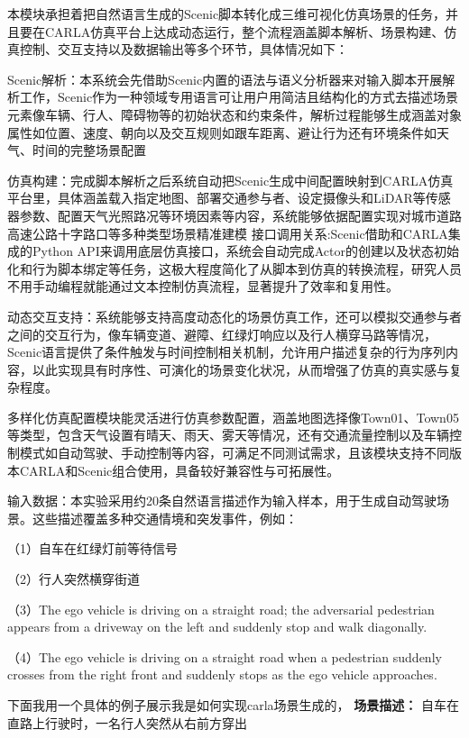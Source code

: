 本模块承担着把自然语言生成的Scenic脚本转化成三维可视化仿真场景的任务，并且要在CARLA仿真平台上达成动态运行，整个流程涵盖脚本解析、场景构建、仿真控制、交互支持以及数据输出等多个环节，具体情况如下：

Scenic解析：本系统会先借助Scenic内置的语法与语义分析器来对输入脚本开展解析工作，Scenic作为一种领域专用语言可让用户用简洁且结构化的方式去描述场景元素像车辆、行人、障碍物等的初始状态和约束条件，解析过程能够生成涵盖对象属性如位置、速度、朝向以及交互规则如跟车距离、避让行为还有环境条件如天气、时间的完整场景配置

仿真构建：完成脚本解析之后系统自动把Scenic生成中间配置映射到CARLA仿真平台里，具体涵盖载入指定地图、部署交通参与者、设定摄像头和LiDAR等传感器参数、配置天气光照路况等环境因素等内容，系统能够依据配置实现对城市道路高速公路十字路口等多种类型场景精准建模
接口调用关系:Scenic借助和CARLA集成的Python API来调用底层仿真接口，系统会自动完成Actor的创建以及状态初始化和行为脚本绑定等任务，这极大程度简化了从脚本到仿真的转换流程，研究人员不用手动编程就能通过文本控制仿真流程，显著提升了效率和复用性。

动态交互支持：系统能够支持高度动态化的场景仿真工作，还可以模拟交通参与者之间的交互行为，像车辆变道、避障、红绿灯响应以及行人横穿马路等情况，Scenic语言提供了条件触发与时间控制相关机制，允许用户描述复杂的行为序列内容，以此实现具有时序性、可演化的场景变化状况，从而增强了仿真的真实感与复杂程度。

多样化仿真配置模块能灵活进行仿真参数配置，涵盖地图选择像Town01、Town05等类型，包含天气设置有晴天、雨天、雾天等情况，还有交通流量控制以及车辆控制模式如自动驾驶、手动控制等内容，可满足不同测试需求，且该模块支持不同版本CARLA和Scenic组合使用，具备较好兼容性与可拓展性。


输入数据：本实验采用约20条自然语言描述作为输入样本，用于生成自动驾驶场景。这些描述覆盖多种交通情境和突发事件，例如：

（1）自车在红绿灯前等待信号

（2）行人突然横穿街道

（3）The ego vehicle is driving on a straight road; the adversarial pedestrian appears from a driveway on the left and suddenly stop and walk diagonally.

（4）The ego vehicle is driving on a straight road when a pedestrian suddenly crosses from the right front and suddenly stops as the ego vehicle approaches.

下面我用一个具体的例子展示我是如何实现carla场景生成的，
\textbf{场景描述：} 自车在直路上行驶时，一名行人突然从右前方穿出

